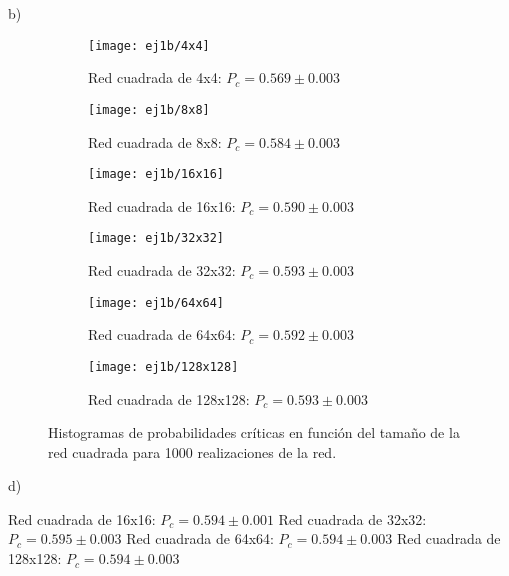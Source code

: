\documentclass[%
 reprint,
 amsmath,amssymb,
 aps,
spanish]{revtex4-1}
\begin{document}
b)

\begin{figure}[h]
\begin{subfigure}{.25\textwidth}
  \centering
  \texttt{[image: ej1b/4x4]}
  \caption{Red cuadrada de 4x4: $P_c=0.569\pm0.003$}
  \label{fig:1b4x4}
\end{subfigure}%
\begin{subfigure}{.25\textwidth}
  \centering
  \texttt{[image: ej1b/8x8]}
  \caption{Red cuadrada de 8x8: $P_c=0.584\pm0.003$}
  \label{fig:1b8x8}
\end{subfigure}
\begin{subfigure}{.25\textwidth}
  \centering
  \texttt{[image: ej1b/16x16]}
  \caption{Red cuadrada de 16x16: $P_c=0.590\pm0.003$}  
  \label{fig:1b16x16}
\end{subfigure}%
\begin{subfigure}{.25\textwidth}
  \centering
  \texttt{[image: ej1b/32x32]}
  \caption{Red cuadrada de 32x32: $P_c=0.593\pm0.003$}  
  \label{fig:1b32x32}
\end{subfigure}
\begin{subfigure}{.25\textwidth}
  \centering
  \texttt{[image: ej1b/64x64]}
  \caption{Red cuadrada de 64x64: $P_c=0.592\pm0.003$}  
  \label{fig:1b64x64}
\end{subfigure}%
\begin{subfigure}{.25\textwidth}
  \centering
  \texttt{[image: ej1b/128x128]}
  \caption{Red cuadrada de 128x128: $P_c=0.593\pm0.003$}  
  \label{fig:1b128x128}
\end{subfigure}
\caption{Histogramas de probabilidades críticas en función del tamaño de la red cuadrada para 1000 realizaciones de la red.}
\label{fig:1b}
\end{figure}

d)

Red cuadrada de 16x16: $P_c=0.594\pm0.001$
Red cuadrada de 32x32: $P_c=0.595\pm0.003$
Red cuadrada de 64x64: $P_c=0.594\pm0.003$
Red cuadrada de 128x128: $P_c=0.594\pm0.003$
\end{document}
